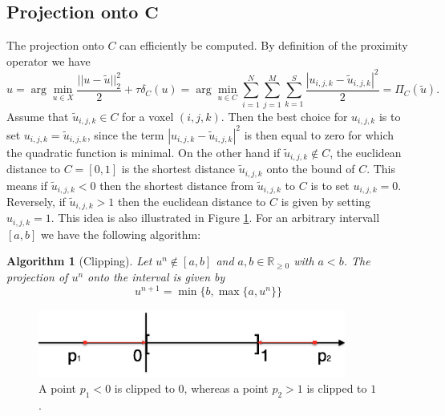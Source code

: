 \documentclass[abstracton]{scrreprt}
\newtheorem{algorithm}[theorem]{Algorithm}
\begin{document}
        \subsection{Projection onto $\boldsymbol{C}$}
            The projection onto $C$ can efficiently be computed. By definition of the proximity operator we have
                $$
                    u = \arg\min_{u \in X} \frac{||u-\tilde{u}||_{2}^{2}}{2} + \tau \delta_{C}(u) = \arg\min_{u \in C} \sum_{i = 1}^{N} \sum_{j = 1}^{M} \sum_{k = 1}^{S} \frac{|u_{i,j,k} - \tilde{u}_{i,j,k}|^{2}}{2} = \Pi_{C}(\tilde{u}).
                $$
            Assume that $\tilde{u}_{i,j,k} \in C$ for a voxel $(i,j,k)$. Then the best choice for $u_{i,j,k}$ is to set $u_{i,j,k} = \tilde{u}_{i,j,k}$, since the term $|u_{i,j,k} - \tilde{u}_{i,j,k}|^{2}$ is then equal to zero for which the quadratic function is minimal. On the other hand if $\tilde{u}_{i,j,k} \notin C$, the euclidean distance to $C = [0, 1]$ is the shortest distance $\tilde{u}_{i,j,k}$ onto the bound of $C$. This means if $\tilde{u}_{i,j,k} < 0$ then the shortest distance from $\tilde{u}_{i,j,k}$ to $C$ is to set $u_{i,j,k} = 0$. Reversely, if $\tilde{u}_{i,j,k} > 1$ then the euclidean distance to $C$ is given by setting $u_{i,j,k} = 1$. This idea is also illustrated in Figure \ref{fig:projection_onto_c}. For an arbitrary intervall $[a, b]$ we have the following algorithm:
            \begin{algorithm}[Clipping]
                Let $u^{n} \notin [a,b]$ and $a, b \in \mathbb{R}_{\ge 0}$ with $a < b$. The projection of $u^{n}$ onto the interval is given by
                    \begin{equation}
                        u^{n+1} = \min\{b, \max \{ a, u^{n} \} \}
                        \label{eq:clipping}
                    \end{equation}
            \end{algorithm}
            \begin{figure}[!ht]
                \centering
                \includegraphics[width=0.9\textwidth]{img/projection_onto_c.png}
                \caption[Clipping on a set.]{A point $p_{1} < 0$ is clipped to $0$, whereas a point $p_{2} > 1$ is clipped to $1$.}
                \label{fig:projection_onto_c}
            \end{figure}
\end{document}
